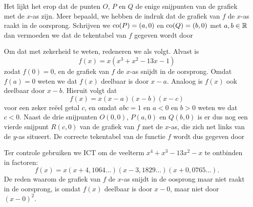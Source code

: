 \documentclass{ximera}
\begin{document}
\begin{example}
\begin{image}
\end{image}


Het lijkt het erop dat de punten \(O\), \(P\) en \(Q\) de enige snijpunten van de grafiek met de \(x\)-as zijn. Meer bepaald, we hebben de indruk dat de grafiek van \(f\) de \(x\)-as raakt in de oorsprong. Schrijven we \(\operatorname{co}(P) = (a,0)\) en \(\operatorname{co}(Q) = (b,0)\) met \(a,b \in \mathbb{R}\) dan vermoeden we dat de tekentabel van \(f\) gegeven wordt door
\renewcommand{\kolbreed}{\widthof{\(a\)}}


Om dat met zekerheid te weten, redeneren we als volgt. Alvast is 
\[
f(x) = x(x^3 + x^2 - 13x - 1)
\]
zodat \(f(0) = 0\), en de grafiek van \(f\) de \(x\)-as snijdt in de oorsprong.  Omdat \(f(a) = 0\) weten we dat \(f(x)\) deelbaar is door \(x-a\). Analoog is \(f(x)\) ook deelbaar door \(x-b\). Hieruit volgt dat 
\[
f(x) = x(x-a)(x-b)(x-c)
\]
voor een zeker reëel getal \(c\), en omdat \(abc = 1\) en \(a < 0\) en \(b > 0\) weten we dat \(c < 0\). Naast de drie snijpunten \(O(0,0)\), \(P(a,0)\) en \(Q(b,0)\) is er dus nog een vierde snijpunt \(R(c,0)\) van de grafiek van \(f\) met de \(x\)-as, die zich net links van de \(y\)-as situeert. De correcte tekentabel van de functie \(f\) wordt dus gegeven door
\renewcommand{\kolbreed}{\widthof{\(a\)}}


Ter controle gebruiken we ICT om de veelterm \(x^4 + x^3 - 13x^2-x\) te ontbinden in factoren:
\[
f(x) = x(x+4,1064\ldots)(x-3,1829\ldots)(x+0,0765\ldots).
\]
De reden waarom de grafiek van \(f\) de \(x\)-as snijdt in de oosprong maar niet raakt in de oorsprong, is omdat \(f(x)\) deelbaar is door \(x-0\), maar niet door \((x-0)^2\). 
\end{example} 

	
\end{document}
